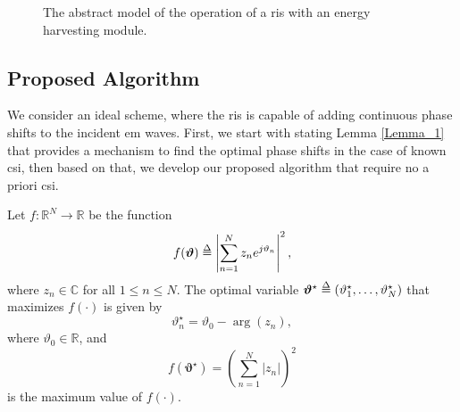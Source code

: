 \documentclass[conference]{IEEEtran}
\begin{document}
\begin{figure}[t]
    \hspace{-9mm}
    \scalebox{0.8}{}
    \caption{\small The abstract model of the operation of a \gls*{ris} with an energy harvesting module.}
    \label{fig:Harvesting_Structure}
\end{figure}



\subsection{Proposed Algorithm}
We consider an ideal scheme, where the \gls*{ris} is capable of adding continuous phase shifts to the incident \gls*{em} waves. 
First, we start with stating Lemma \ref{Lemma_1} that provides a mechanism to find the optimal phase shifts in the case of known \gls*{csi}, then based on that, we develop our proposed algorithm that require no a priori \gls*{csi}.
\begin{lem}\label{Lemma_1}
Let $f:\mathbb{R}^{N}\rightarrow \mathbb{R}$ be the function 
\begin{equation}\label{eq:def_f}
    f{\left(\bm{\vartheta}\right)}\delequal\left|\sum_{n=1}^{N} z_{n}e^{j\vartheta_{n}}\right|^{2},
\end{equation}
where $z_{n}\in \mathbb{C}$ for all $1\leq n\leq N$. The optimal variable $\bm{\vartheta}^{\star}\delequal\left(\vartheta_{1}^{\star}, \dots, \vartheta_{N}^{\star}\right)$ that maximizes $f{\left(\cdot\right)}$ is given by
\begin{equation}
     \vartheta_{n}^{\star}=\vartheta_{0}-\arg\left(z_{n}\right),
\end{equation}
where $\vartheta_{0}\in \mathbb{R}$, and
\begin{equation}
    f{\left(\bm{\vartheta}^{\star}\right)} = \left(\sum_{n=1}^{N}\left|z_{n}\right|\right)^{2}
\end{equation}
is the maximum value of $f{\left(\cdot\right)}$.
\end{lem}
\end{document}
